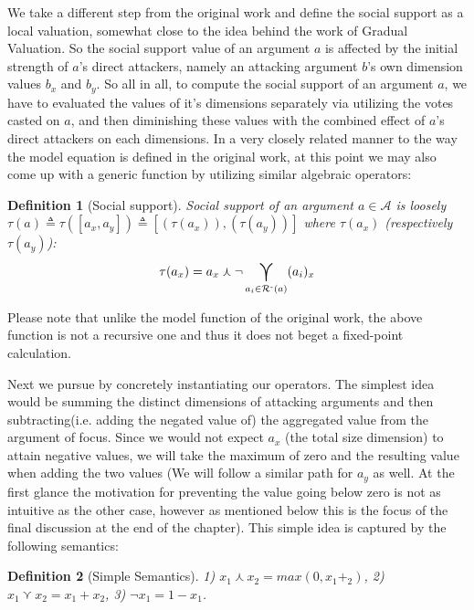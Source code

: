 \documentclass{article}
\newtheorem{definition}{Definition}
\newcommand{\args}{\mathcal{A}} %
\newcommand{\att}{\mathcal{R}}  %
\newcommand{\attackers}[1]{\att^\text{-}\left(#1\right)}
\newcommand{\SAFand}{\curlywedge}     %
\DeclareMathOperator*{\SAFOr}{\bigcurlyvee} %
\begin{document}
 We take a different step from the original work and define the social support as a local valuation, somewhat close to the idea behind the work of Gradual Valuation. So the social support value of an argument $a$ is affected by the initial strength of $a$'s direct attackers, namely an attacking argument $b$'s own dimension values $b_{x}$ and $ b_{y}$. So all in all, to compute the social support of an argument $a$, we have to evaluated the values of it's dimensions separately via utilizing the votes casted on $a$, and then diminishing these values with the combined effect of $a$'s direct attackers on each dimensions. In a very closely related manner to the way the model equation is defined in the original work, at this point we may also come up with a generic function by utilizing similar algebraic operators:

\begin{definition}[Social support]
\label{def:ss}
  Social support of an argument  $a \in \args$ is loosely $\tau(a) \triangleq \tau([a_{x}, a_{y}]) \triangleq [(\tau(a_{x})), (\tau(a_{y}))]$ where $\tau(a_{x})$ (respectively $\tau(a_{y})$):
  $$\displaystyle \tau(a_x) = a_{x} \SAFand \lnot \SAFOr_{a_i \in \attackers{a}} (a_{i})_{x}$$
\end{definition}

Please note that unlike the model function of the original work, the above function is not a recursive one and thus it does not beget a fixed-point calculation.

 Next we pursue by concretely instantiating our operators. The simplest idea would be summing the distinct dimensions of attacking arguments and then subtracting(i.e. adding the negated value of) the aggregated value from the argument of focus.  Since we would not expect $a_{x}$ (the total size dimension) to attain negative values, we will take the maximum of zero and the resulting value when adding the two values (We will follow a similar path for $a_{y}$ as well. At the first glance the motivation for preventing the value going below zero is not as intuitive as the other case, however as mentioned below this is the focus of the final discussion at the end of the chapter). This simple idea is captured by the following semantics:

\begin{definition} [Simple Semantics]
 1) $x_{1}\curlywedge
x_{2}=max(0, x_{1} +_{2})$, 2) $x_{1}\curlyvee x_{2}=x_{1}+x_{2}$, 3) $\lnot x_{1}=1-x_{1}$.
\end{definition}
\end{document}
